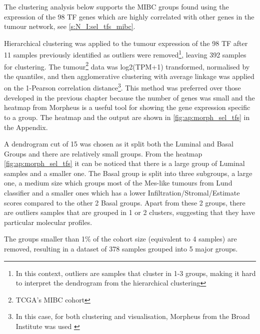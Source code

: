 The clustering analysis below supports the MIBC groups found using the expression of the 98 TF genes which are highly correlated with other genes in the tumour network, see \cref{s:N_I:sel_tfs_mibc}.

Hierarchical clustering was applied to the tumour expression of the 98 TF after 11 samples previously identified as outliers were removed\footnote{In this context, outliers are samples that cluster in 1-3 groups, making it hard to interpret the dendrogram from the hierarchical clustering}, leaving 392 samples for clustering. The tumour\footnote{TCGA's MIBC cohort} data was log2(TPM+1) transformed, normalised by the quantiles, and then agglomerative clustering with average linkage was applied on the 1-Pearson correlation distance\footnote{In this case, for both clustering and visualisation, Morpheus from the Broad Institute was used \cite{Broad-InstituteUnknown-kn}}. This method was preferred over those developed in the previous chapter because the number of genes was small and the heatmap from Morpheus is a useful tool for showing the gene expression specific to a group. The heatmap and the output are shown in \cref{fig:ap:morph_sel_tfs} in the Appendix.

A dendrogram cut of 15 was chosen as it split both the Luminal and Basal Groups and there are relatively small groups. From the heatmap \cref{fig:ap:morph_sel_tfs} it can be noticed that there is a large group of Luminal samples and a smaller one. The Basal group is split into three subgroups, a large one, a medium size which groups most of the Mes-like tumours from Lund classifier and a smaller ones which has a lower Infiltration/Stromal/Estimate scores compared to the other 2 Basal groups. Apart from these 2 groups, there are outliers samples that are grouped in 1 or 2 clusters, suggesting that they have particular molecular profiles.

The groups smaller than 1\% of the cohort size (equivalent to 4 samples) are removed, resulting in a dataset of 378 samples grouped into 5 major groups. 


